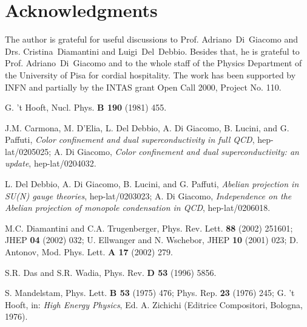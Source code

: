 \documentclass[a4paper,12pt]{article}
\begin{document}
\section{Acknowledgments}

The author is grateful for useful discussions to Prof. Adriano~Di~Giacomo and Drs. Cristina~Diamantini
and Luigi~Del~Debbio.
Besides that, he is grateful to
Prof. Adriano~Di~Giacomo and to the whole staff of the Physics Department of the
University of Pisa for cordial hospitality.
The work has been supported by INFN and partially by
the INTAS grant Open Call 2000, Project No. 110.







\newpage


\begin{thebibliography}{99}

G. 't Hooft, Nucl. Phys. {\bf B 190} (1981) 455.

J.M. Carmona, M. D'Elia, L. Del Debbio, A. Di Giacomo, B. Lucini, and G. Paffuti, {\it Color confinement
and dual superconductivity in full QCD}, hep-lat/0205025; A. Di Giacomo, {\it Color confinement and dual
superconductivity: an update}, hep-lat/0204032.

L. Del Debbio, A. Di Giacomo, B. Lucini, and G. Paffuti, {\it Abelian projection in SU(N) gauge theories},
hep-lat/0203023;
A. Di Giacomo, {\it Independence on the Abelian projection of monopole condensation in QCD}, hep-lat/0206018.

M.C. Diamantini and C.A. Trugenberger, Phys. Rev. Lett. {\bf 88} (2002) 251601; JHEP {\bf 04} (2002) 032;
U. Ellwanger and N. Wschebor, JHEP {\bf 10} (2001) 023; D. Antonov, Mod. Phys. Lett. {\bf A 17} (2002) 279.

S.R. Das and S.R. Wadia, Phys. Rev. {\bf D 53} (1996) 5856.

S. Mandelstam, Phys. Lett. {\bf B 53} (1975) 476; Phys. Rep.
{\bf 23} (1976) 245; G. 't Hooft, in: {\it High Energy Physics},
Ed. A. Zichichi (Editrice Compositori, Bologna, 1976).


\end{thebibliography}
\end{document}
